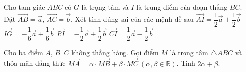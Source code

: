 
\begin{ex}%
	Cho tam giác $ABC$ có $G$ là trọng tâm và $I$ là trung điểm của đoạn thẳng $BC$. Đặt $\overrightarrow{AB}=\overrightarrow{a}$, $\overrightarrow{AC}=\overrightarrow{b}$. Xét tính đúng  sai của các mệnh đề sau
	 \choiceTF
		 {\True $\overrightarrow{AI}=\dfrac{1}{2}\overrightarrow{a}+\dfrac{1}{2}\overrightarrow{b}$}
		 {$\overrightarrow{IG}=-\dfrac{1}{6}\overrightarrow{a}+\dfrac{1}{6}\overrightarrow{b}$}
		 {\True $\overrightarrow{BI}=-\dfrac{1}{2}\overrightarrow{a}+\dfrac{1}{2}\overrightarrow{b}$}
		{\True  $\overrightarrow{CI}=\dfrac{1}{2}\overrightarrow{a}-\dfrac{1}{2}\overrightarrow{b}$}
\end{ex}



\begin{bt}%
	Cho ba điểm $A$, $B$, $C$ không thẳng hàng. Gọi điểm $M$ là trọng tâm $\triangle ABC$ và thỏa mãn đẳng thức $\overrightarrow{MA}=\alpha \cdot\overrightarrow{MB}+\beta\cdot \overrightarrow{MC}~(\alpha, \beta \in \mathbb{R})$.  Tính $2\alpha+\beta$.
\end{bt}

